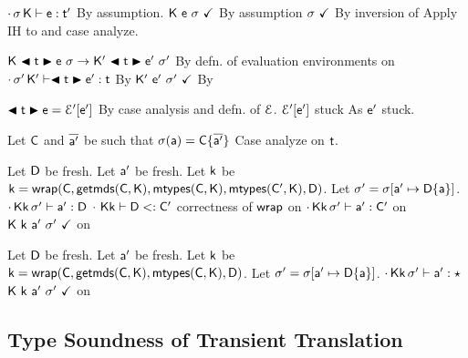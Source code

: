 \documentclass[a4paper,USenglish]{tex/lipics-v2016}
\begin{document}
\begin{proofy}
\step[base] $\EnvType\cdot\s\K\e\tp$ \basis By assumption.
\step[progform] ${\sf{K}}~{\sf{e}}~\sigma~\checkmark$ \basis By assumption
\step[inpswf] $\sigma~\checkmark$ \basis By inversion of 
\step Apply IH to  and case analyze.
\begin{casel}
  \caseof{ \begin{iknown}
    \step[kred] $\Reduce\K\e\s\Kp\ep\sp$
    \step[kbase] $\WFp\Kp{\ep~\sp}$ 
    \step $\EnvType\cdot\sp\Kp\ep\tp$
    \end{iknown}} 
  \begin{proofy}
  \step $\Reduce\K{\BehCast{\t}{\e}}\s\Kp{\BehCast{\t}{\ep}}\sp$ \basis By defn. of evaluation environments on 
  \step[ktype] $\EnvType\cdot\sp\Kp{\BehCast\t\ep}\t$ \basis By 
  \step $\WFp\Kp{\ep~\sp}$ \basis By 
  \end{proofy}
  \begin{proofy}
    \step $\BehCast\t\e = \EE'[\ep]$ \basis By case analysis and defn. of $\mathcal{E}$.
    \step $\mathcal{E}'[{{{\sf{e'}}}}]$ stuck \basis As ${{{\sf{e'}}}}$ stuck.
  \end{proofy}
  \caseof{$\e = \a$}
  \begin{proofy}
    \step Let ${\sf{C}}$ and $\overline{{\sf{a}}'}$ be such that $\sigma({\sf{a}}) = {\sf{C}}\{\overline{{\sf{a}}'}\}$
    \step Case analyze on $\t$.
    \begin{casel}
      \caseof{$\t = \Cp$}
      \begin{proofy}
        \step Let ${\sf{D}}$ be fresh.
        \step Let ${\sf{a}}'$ be fresh.
        \step[wcorr] Let ${\sf{k}}$ be ${\sf{k}} = {\sf{wrap}}({\sf{C}},{\sf{getmds}}({\sf{C}},{\sf{K}}),{\sf{mtypes}}({\sf{C}},{\sf{K}}),{\sf{mtypes}}({\sf{C'}},{\sf{K}}),{\sf{D}})$.
        \step Let ${{\sigma'}} = \sigma[{\sf{a}}' \mapsto {\sf{D}}\{{\sf{a}}\}]$.
        \step[b2] $\cdot\,{\sf{K}}{\sf{k}}\,{{\sigma'}}\vdash {\sf{a}}' : {\sf{D}}$ \basis {}
        \step[b1] $\cdot~{\sf{K}}{\sf{k}}\vdash {\sf{D}}<: {\sf{C'}}$ \basis correctness of ${\sf{wrap}}$ on 
        \step[wth] $\cdot\,{\sf{K}}{\sf{k}}\,{{\sigma'}}\vdash {\sf{a}}' : {\sf{C'}}$ \basis {} on 
        \step ${\sf{K}} ~ {\sf{k}}~{\sf{a}}'~{{\sigma'}}~\checkmark$ \basis {} on 
      \end{proofy}
      \caseof{$\t = \any$}
      \begin{proofy}
        \step Let ${\sf{D}}$ be fresh.
        \step Let ${\sf{a}}'$ be fresh.
        \step[wcorr2] Let ${\sf{k}}$ be ${\sf{k}} = {\sf{wrap}}({\sf{C}},{\sf{getmds}}({\sf{C}},{\sf{K}}),{\sf{mtypes}}({\sf{C}},{\sf{K}}),{\sf{D}})$.
        \step Let ${{\sigma'}} = \sigma[{\sf{a}}' \mapsto {\sf{D}}\{{\sf{a}}\}]$.
        \step[b21] $\cdot\,{\sf{K}}{\sf{k}}\,{{\sigma'}}\vdash {\sf{a}}' : \star$ \basis {}
        \step ${\sf{K}} ~ {\sf{k}}~{\sf{a}}'~{{\sigma'}}~\checkmark$ \basis {} on 
      \end{proofy}
    \end{casel}
  \end{proofy}
\end{casel}
\end{proofy}


\subsection{Type Soundness of Transient Translation}
\end{document}

